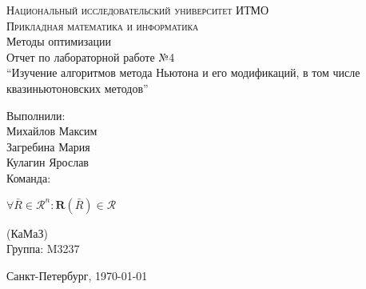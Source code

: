 





\begin{titlepage}
	\begin{center}
		\textsc{Национальный исследовательский университет ИТМО\\
			Прикладная математика и информатика}\\[5cm]

		\huge{Методы оптимизации\\[6mm]
			\large Отчет по лабораторной работе №4\\
			``Изучение алгоритмов метода Ньютона и его модификаций, в том числе
			квазиньютоновских методов''\\[4cm]

		}
	\end{center}

	\begin{flushright}
		\begin{minipage}{0.25\textwidth}
			Выполнили:\\[2mm]
			Михайлов Максим\\
			Загребина Мария\\
			Кулагин Ярослав\\[2mm]
			Команда:

			\(\forall \bar R \in \mathscr{R}^n : \mathrm{\textbf{R}}(\bar R) \in \mathscr{R}\)

			(КаМаЗ)\\[2mm]
			Группа: M3237
		\end{minipage}
	\end{flushright}

	\vfill
	\begin{center}
		Санкт-Петербург, \today
	\end{center}
\end{titlepage}





